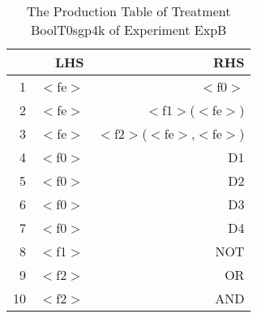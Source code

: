 \begin{table}[ht]
\centering
\begin{tabular}{rrr}
  \hline
 & LHS & RHS \\ 
  \hline
1 & $<$fe$>$ & $<$f0$>$ \\ 
  2 & $<$fe$>$ & $<$f1$>$($<$fe$>$) \\ 
  3 & $<$fe$>$ & $<$f2$>$($<$fe$>$,$<$fe$>$) \\ 
  4 & $<$f0$>$ & D1 \\ 
  5 & $<$f0$>$ & D2 \\ 
  6 & $<$f0$>$ & D3 \\ 
  7 & $<$f0$>$ & D4 \\ 
  8 & $<$f1$>$ & NOT \\ 
  9 & $<$f2$>$ & OR \\ 
  10 & $<$f2$>$ & AND \\ 
   \hline
\end{tabular}
\caption{The Production Table of Treatment BoolT0sgp4k of Experiment ExpB} 
\end{table}
